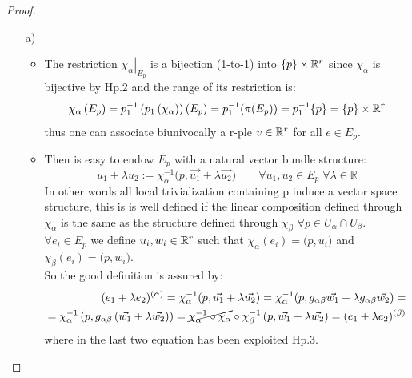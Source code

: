 \documentclass[a4paper,12pt]{scrartcl}    %
\begin{document}
\begin{proof}
\begin{itemize}
\item[a)]
	\begin{itemize}
		\item The restriction $\left. \chi_\alpha \right|_{E_p}$ is a bijection (1-to-1) into $\{p\}\times \mathbb{R}^r$ since $\chi_\alpha$ is bijective by Hp.2 and the range of its restriction is:
		\begin{displaymath}
			\chi_\alpha \left( E_p \right) = p_1^{-1} \left(p_1 \left( \chi_\alpha \right)\right) (E_p) = 
			p_1^{-1} (\pi(E_p) ) = p_1^{-1} \{p\} = \{p\} \times \mathbb{R}^r
		\end{displaymath}
		thus one can associate biunivocally a r-ple $v\in\mathbb{R}^r$ for all $e \in E_{p}$.
		
	\item 	Then is easy to endow $E_p$ with a natural vector bundle structure:
	\begin{displaymath}
	u_1 + \lambda u_2 := \chi_\alpha^{-1} \big( p, \vec{u_1} + \lambda \vec{u_2}) \qquad \forall u_1,u_2 \in E_p \; \forall \lambda \in \mathbb{R}
	\end{displaymath}
	In other words all local trivialization containing p induce a vector space structure, this is is well defined if the linear composition defined through $\chi_\alpha$ is the same as the structure defined through $\chi_\beta$ $\forall p \in U_\alpha \cap U_\beta$.
\\
	 $\forall e_i \in E_p$ we define $u_i,w_i \in \mathbb{R}^r$ such that $\chi_\alpha (e_i) = \big(p, u_i \big)$ and $\chi_\beta (e_i) = \big(p, w_i \big)$.
\\
So the good definition is assured by:
	\begin{eqnarray}
		(e_1 + \lambda e_2)^{(\alpha)} = \chi_\alpha^{-1} (p, \vec{u_1} + \lambda \vec{u_2} ) =
		\chi_\alpha^{-1} (p, g_{\alpha \beta}\vec{w_1} + \lambda g_{\alpha \beta}\vec{w_2} ) =\\=
		\chi_\alpha^{-1} \left(p, g_{\alpha \beta} \left(\vec{w_1} + \lambda \vec{w_2}\right)\right) =
		\cancel{\chi_\alpha^{-1} \circ\chi_\alpha }\circ \chi_\beta^{-1}\left(p, \vec{w_1} + \lambda \vec{w_2}\right)= (e_1 + \lambda e_2)^{(\beta)}
	\end{eqnarray}
	where in the last two equation has been exploited Hp.3.
	
	\end{itemize}



\end{itemize}
\end{proof}
\end{document}
